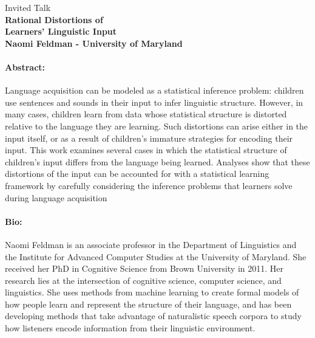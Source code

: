 \documentclass[11pt]{article}
\begin{document}
\begin{center}
{\Large Invited Talk \hfill\\}
\vspace{3mm}
  {\LARGE \bf  Rational Distortions of \hfill\\}
{\LARGE \bf Learners' Linguistic Input \hfill\\}
\vspace{6mm}
{\Large \bf  Naomi Feldman - University of Maryland}\hfill\\

\end{center}

\vspace*{0.5cm}






\paragraph{Abstract:}
Language acquisition can be modeled as a statistical inference problem: children use sentences and sounds in their input to infer linguistic structure.  However, in many cases, children learn from data whose statistical structure is distorted relative to the language they are learning.  Such distortions can arise either in the input itself, or as a result of children's immature strategies for encoding their input.  This work examines several cases in which the statistical structure of children's input differs from the language being learned.  Analyses show that these distortions of the input can be accounted for with a statistical learning framework by carefully considering the inference problems that learners solve during language acquisition
\paragraph{Bio:} Naomi Feldman is an associate professor in the Department of Linguistics and the Institute for Advanced Computer Studies at the University of Maryland.  She received her PhD in Cognitive Science from Brown University in 2011.   Her research lies at the intersection of cognitive science, computer science, and linguistics.  She uses methods from machine learning to create formal models of how people learn and represent the structure of their language, and has been developing methods that take advantage of naturalistic speech corpora to study how listeners encode information from their linguistic environment.
\end{document}
